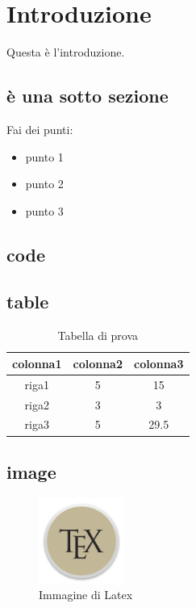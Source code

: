 %
%

\section{Introduzione}
Questa è l'introduzione.\\ 

\subsection{è una sotto sezione}
Fai dei punti:
\begin{itemize}
\item punto 1
\item punto 2
\item punto 3
\end{itemize}

\subsection{code}


\subsection{table}

\begin {table}[H]
\caption {Tabella di prova} \label{tab:tabprova} 
\begin{center}
\begin{tabular}{|c|c|c|}
  
  \hline
  \rowcolor[gray]{.6}
  \textbf{colonna1} & \textbf{colonna2} & \textbf{colonna3} \\
  
  \hline
  \rowcolor[gray]{.8}
  riga1 &  5 & 15\\
  
  \hline
  \rowcolor[gray]{.9}
  riga2 &  3 & 3\\
  
  \hline
  \rowcolor[gray]{.8}
  riga3 & 5 & 29.5\\
  
  \hline
\end{tabular} 
\end{center}
\end{table}

\subsection{image}

\begin{figure}[htbp]
\begin{flushright}
\centering
\includegraphics[width=0.25\textwidth]{figure/tex.png}
\caption{Immagine di Latex}
\label{fig:gc}
\end{flushright}
\end{figure}
